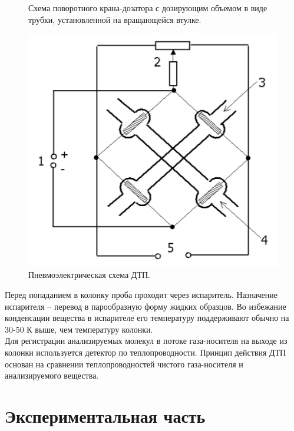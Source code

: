 \documentclass[12pt]{article}
\begin{document}
\begin{flushleft}
\begin{figure}[!h]
\begin{center}
\begin{minipage}[h]{0.4\linewidth}
\caption{Схема поворотного крана-дозатора с
дозирующим объемом в виде трубки, установленной
на вращающейся втулке.} %
\label{ris:experimoriginal} %
\end{minipage}
\hfill 
\begin{minipage}[h]{0.4\linewidth}
\includegraphics[width=1.0\linewidth]{6}
\caption{Пневмоэлектрическая схема ДТП.}
\label{ris:experimcoded}
\end{minipage}
\end{center}
\end{figure}
Перед попаданием в колонку проба
проходит через испаритель.
Назначение испарителя – перевод в
парообразную форму жидких образцов. Во избежание конденсации вещества в испарителе
его температуру поддерживают обычно на 30-50 К выше, чем температуру колонки. \\
Для регистрации анализируемых молекул в потоке газа-носителя на выходе из
колонки используется детектор по теплопроводности. Принцип действия ДТП основан на
сравнении теплопроводностей чистого газа-носителя и анализируемого вещества. 
\section{Экспериментальная часть}

\end{flushleft}
\end{document}
